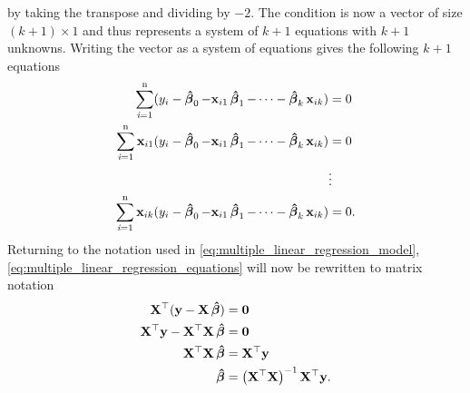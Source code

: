 by taking the transpose and dividing by $-2$.
The condition is now a vector of size $(k + 1) \times 1$ and thus represents a system of $k + 1$ equations with $k + 1$ unknowns.
Writing the vector as a system of equations gives the following $k + 1$ equations
\begin{align}\label{eq:multiple_linear_regression_equations}
\begin{split}
    \operatorname{\sum_{\textit{i}=1}^n} (y_i - \operatorname{\boldsymbol{\hat{\beta}}}_0 -  \mathbf{x}_{i1} \operatorname{\boldsymbol{\hat{\beta}}}_1 - \cdots - \operatorname{\boldsymbol{\hat{\beta}}}_k \mathbf{x}_{ik}) &= 0 \\
    \operatorname{\sum_{\textit{i}=1}^n} \mathbf{x}_{i1}(y_i - \operatorname{\boldsymbol{\hat{\beta}}}_0 -  \mathbf{x}_{i1} \operatorname{\boldsymbol{\hat{\beta}}}_1 - \cdots - \operatorname{\boldsymbol{\hat{\beta}}}_k \mathbf{x}_{ik}) &= 0 \\
    &\vdots \\
    \operatorname{\sum_{\textit{i}=1}^n} \mathbf{x}_{ik}(y_i - \operatorname{\boldsymbol{\hat{\beta}}}_0 -  \mathbf{x}_{i1} \operatorname{\boldsymbol{\hat{\beta}}}_1 - \cdots - \operatorname{\boldsymbol{\hat{\beta}}}_k \mathbf{x}_{ik}) &= 0.
\end{split}
\end{align}
Returning to the notation used in \eqref{eq:multiple_linear_regression_model}, \eqref{eq:multiple_linear_regression_equations} will now be rewritten to matrix notation
\begin{align}
    \mathbf{X}^\top(\mathbf{y} - \mathbf{X}\operatorname{\boldsymbol{\hat{\beta}}}) &= \mathbf{0} \nonumber\\
    \mathbf{X}^\top\mathbf{y} - \mathbf{X}^\top\mathbf{X}\operatorname{\boldsymbol{\hat{\beta}}} &= \mathbf{0}\nonumber\\
    \mathbf{X}^\top\mathbf{X}\operatorname{\boldsymbol{\hat{\beta}}} &= \mathbf{X}^\top\mathbf{y}\label{eq:equation_from} \\
    \operatorname{\boldsymbol{\hat{\beta}}} &= \left(\mathbf{X}^\top\mathbf{X}\right)^{-1}\mathbf{X}^\top\mathbf{y}. \label{eq:equation_to}
\end{align}

